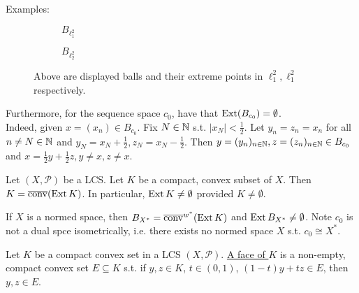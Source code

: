 \documentclass{article}
\begin{document}
\begin{examplesblock}{Examples:}\label{examples: 11}
    \begin{figure}[H]
\begin{subfigure}{0.5\textwidth}
  \centering
  
  \caption{$B_{\ell_1^2}$}
  \label{fig:Ball ell 1}
\end{subfigure}%
\begin{subfigure}{0.5\textwidth}
  \centering
  
  \caption{$B_{\ell_2^2}$}
  \label{fig: Balls ell 1,2}
\end{subfigure}
\caption{Above are displayed balls and their extreme points in $\ell_1^2, \ell_1^2$ respectively.}
\label{fig:fig}
\end{figure}

Furthermore, for the sequence space $c_0$, have that $\operatorname{Ext}(B_{c_0})=\emptyset$.\\

Indeed, given $x = (x_n)\in B_{c_0}$. Fix $N\in \mathbb{N}$ s.t. $|x_N|<\frac{1}{2}$. Let $y_n=z_n=x_n$ for all $n\neq N\in \mathbb{N}$ and $y_N = x_N + \frac{1}{2}, z_N = x_N-\frac{1}{2}$. Then $y = (y_n)_{n\in\mathbb{N}}, z = (z_n)_{n\in\mathbb{N}}\in B_{c_0}$ and $x = \frac{1}{2}y + \frac{1}{2}z, y\neq x, z\neq x$.
\end{examplesblock}

\begin{theorem}\label{thm: Krein-Milman}
    Let $(X, \mathcal{P})$ be a LCS. Let $K$ be a compact, convex subset of $X$. Then $K=\overline{\operatorname{conv}}(\operatorname{Ext} K)$. In particular, $\operatorname{Ext} K \neq \emptyset$ provided $K\neq \emptyset$.
\end{theorem}

\begin{boxcor}\label{cor: Krein-Milman}
    If $X$ is a normed space, then $B_{X^*}=\overline{\operatorname{conv}}^{w^*}(\operatorname{Ext} K)$ and $\operatorname{Ext} B_{X^*}\neq \emptyset$. Note $c_0$ is not a dual spce isometrically, i.e. there exists no normed space $X$ s.t. $c_0\cong X^*$.
\end{boxcor}

\begin{boxdef}\label{def: face of convex set}
    Let $K$ be a compact convex set in a LCS $(X, \mathcal{P})$. \noindent\underline{A face of $K$} is a non-empty, compact convex set $E\subseteq K $ s.t. if $y,z\in K$, $t\in (0,1)$, $(1-t)y+tz\in E$, then $y,z\in E$.
\end{boxdef}
\end{document}
